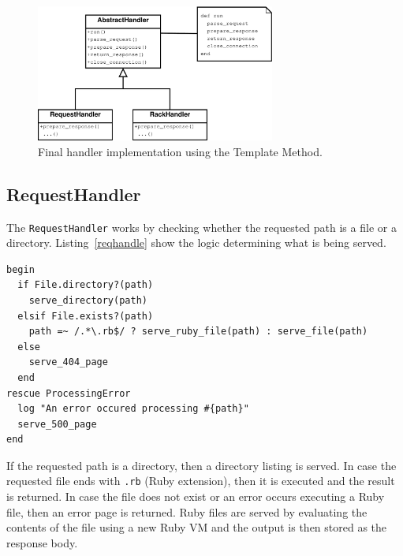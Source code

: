 \begin{figure}[htb]
  \centering
  \includegraphics[width=0.7\textwidth]{diagrams/handlers2.pdf}
  \caption{Final handler implementation using the Template Method.}
  \label{template2}
\end{figure}

\subsection{RequestHandler}
\label{reqhandler}
The \texttt{RequestHandler} works by checking whether the requested path is a
file or a directory. Listing~\ref{reqhandle} show the logic
determining what is being served.

\begin{lstlisting}[label=reqhandle,caption=\texttt{RequestHandler} logic.
(Yarn/lib/yarn/request\_handler.rb:12)]
begin
  if File.directory?(path)
    serve_directory(path)
  elsif File.exists?(path)
    path =~ /.*\.rb$/ ? serve_ruby_file(path) : serve_file(path)
  else
    serve_404_page
  end
rescue ProcessingError
  log "An error occured processing #{path}"
  serve_500_page
end
\end{lstlisting}

If the requested path is a directory, then a directory listing is served. In
case the requested file ends with \texttt{.rb} (Ruby extension), then it is executed and the
result is returned. In case the file does not exist or an error occurs
executing a Ruby file, then an error page is returned. Ruby files are served
by evaluating the contents of the file using a new Ruby
VM and the output is then stored as the response body.

